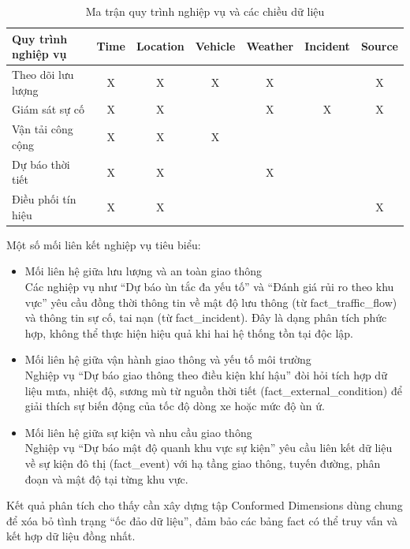 \begin{table}[H]
\centering
\caption{Ma trận quy trình nghiệp vụ và các chiều dữ liệu}
\begin{tabular}{|l|c|c|c|c|c|c|}
\hline
\textbf{Quy trình nghiệp vụ} & \textbf{Time} & \textbf{Location} & \textbf{Vehicle} & \textbf{Weather} & \textbf{Incident} & \textbf{Source} \\ \hline
Theo dõi lưu lượng & X & X & X & X & & X \\ \hline
Giám sát sự cố & X & X & & X & X & X \\ \hline
Vận tải công cộng & X & X & X & & & \\ \hline
Dự báo thời tiết & X & X & & X & & \\ \hline
Điều phối tín hiệu & X & X & & & & X \\ \hline
\end{tabular}
\end{table}

Một số mối liên kết nghiệp vụ tiêu biểu:
\begin{itemize}
    \item Mối liên hệ giữa lưu lượng và an toàn giao thông\\
    Các nghiệp vụ như “Dự báo ùn tắc đa yếu tố” và “Đánh giá rủi ro theo khu vực” yêu cầu đồng thời thông tin về mật độ lưu thông (từ fact\_traffic\_flow) và thông tin sự cố, tai nạn (từ fact\_incident). Đây là dạng phân tích phức hợp, không thể thực hiện hiệu quả khi hai hệ thống tồn tại độc lập.
    \item Mối liên hệ giữa vận hành giao thông và yếu tố môi trường \\
    Nghiệp vụ “Dự báo giao thông theo điều kiện khí hậu” đòi hỏi tích hợp dữ liệu mưa, nhiệt độ, sương mù từ nguồn thời tiết (fact\_external\_condition) để giải thích sự biến động của tốc độ dòng xe hoặc mức độ ùn ứ.
    \item Mối liên hệ giữa sự kiện và nhu cầu giao thông\\
    Nghiệp vụ “Dự báo mật độ quanh khu vực sự kiện” yêu cầu liên kết dữ liệu về sự kiện đô thị (fact\_event) với hạ tầng giao thông, tuyến đường, phân đoạn và mật độ tại từng khu vực.

\end{itemize}

Kết quả phân tích cho thấy cần xây dựng tập Conformed Dimensions dùng chung để xóa bỏ tình trạng “ốc đảo dữ liệu”, đảm bảo các bảng fact có thể truy vấn và kết hợp dữ liệu đồng nhất.


